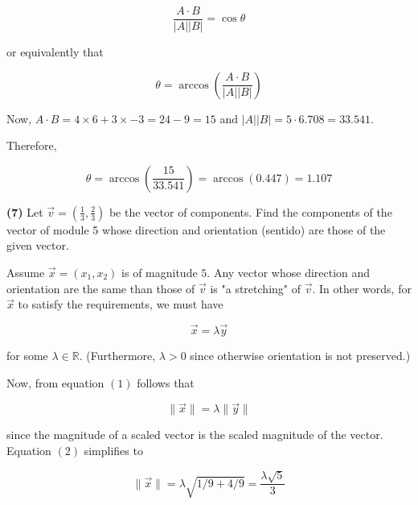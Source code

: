 \documentclass[12pt]{article}
\theoremstyle{definition}
\begin{document}
\begin{equation*}
    \frac{A \cdot B}{\left| A \right|\left| B \right|  } = \cos \theta
\end{equation*}

or equivalently that 

\begin{equation*}
    \theta = \arccos \left( \frac{A \cdot B}{\left| A \right|\left| B \right|  } \right)  
\end{equation*}

Now, $A \cdot B = 4 \times 6 + 3 \times -3 = 24 - 9 = 15$ and $\left| A \right|
\left| B \right| = 5 \cdot 6.708 = 33.541 $.

Therefore, 

\begin{equation*}
    \theta = \arccos \left( \frac{15}{33.541} \right) = \arccos \left( 0.447
    \right) = 1.107
\end{equation*}

\pagebreak 

\begin{shaded}
    \textbf{(7)} Let $\overrightarrow{v} = \left( \frac{1}{3}, \frac{2}{3} \right) $ be the vector of
    components. Find the components of the vector of module 5 whose direction 
    and orientation (sentido) are those of the given vector.
\end{shaded}

Assume $\overrightarrow{x} = (x_1, x_2)$ is of magnitude $5$. Any vector whose
direction and orientation are the same than those of $\vec{v}$ is "a stretching"
of $\vec{v}$. In other words, for $\vec{x}$ to satisfy the requirements, we must
have 

\begin{equation}
    \vec{x} = \lambda \vec{y}
\end{equation}

for some $\lambda \in \mathbb{R}$. (Furthermore, $\lambda > 0$ since otherwise
orientation is not preserved.) 

Now, from equation $(1)$ follows that

\begin{equation}
    \|\vec{x}\| =  \lambda \|\vec{y}\|
\end{equation}

since the magnitude of a scaled vector is the scaled magnitude of the vector.
Equation $(2)$ simplifies to 

\begin{equation}
    \|\vec{x}\|  = \lambda \sqrt{1 / 9 + 4 / 9} = \frac{\lambda
    \sqrt{5} }{3}
\end{equation}
\end{document}
